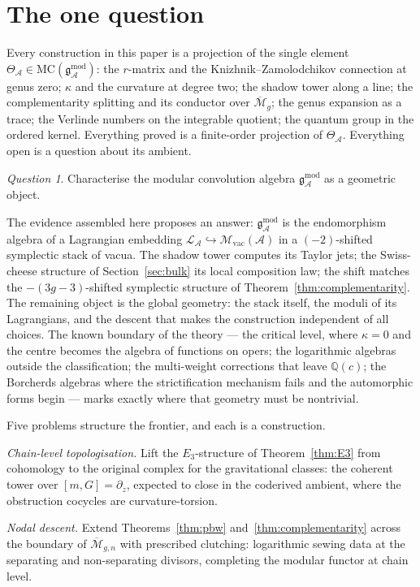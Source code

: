 \documentclass[11pt]{amsart}
\numberwithin{equation}{section}
\theoremstyle{plain}
\theoremstyle{definition}
\theoremstyle{remark}
\newtheorem{question}[theorem]{Question}
\newcommand{\cA}{\mathcal{A}}
\newcommand{\cM}{\mathcal{M}}
\newcommand{\cL}{\mathcal{L}}
\newcommand{\bQ}{\mathbb{Q}}
\newcommand{\gmod}{\mathfrak{g}^{\mathrm{mod}}}
\newcommand{\MC}{\mathrm{MC}}
\newcommand{\Mbar}{\overline{\cM}}
\begin{document}
\section{The one question}\label{sec:question}

Every construction in this paper is a projection of the single element
$\Theta_{\cA}\in\MC(\gmod_{\cA})$: the $r$-matrix and the
Knizhnik--Zamolodchikov connection at genus zero; $\kappa$ and the
curvature at degree two; the shadow tower along a line; the
complementarity splitting and its conductor over $\Mbar_g$; the genus
expansion as a trace; the Verlinde numbers on the integrable quotient;
the quantum group in the ordered kernel. Everything proved is a
finite-order projection of $\Theta_{\cA}$. Everything open is a
question about its ambient.

\begin{question}
Characterise the modular convolution algebra $\gmod_{\cA}$ as a
geometric object.
\end{question}

The evidence assembled here proposes an answer: $\gmod_{\cA}$ is the
endomorphism algebra of a Lagrangian embedding
$\cL_{\cA}\hookrightarrow\cM_{\mathrm{vac}}(\cA)$ in a
$(-2)$-shifted symplectic stack of vacua. The shadow tower computes
its Taylor jets; the Swiss-cheese structure of
Section~\ref{sec:bulk} its local composition law; the shift matches
the $-(3g-3)$-shifted symplectic structure of
Theorem~\ref{thm:complementarity}. The remaining object is the global
geometry: the stack itself, the moduli of its Lagrangians, and the
descent that makes the construction independent of all choices.
The known boundary of the theory --- the critical level, where
$\kappa=0$ and the centre becomes the algebra of functions on opers;
the logarithmic algebras outside the classification; the
multi-weight corrections that leave $\bQ(c)$; the Borcherds algebras
where the strictification mechanism fails and the automorphic forms
begin --- marks exactly where that geometry must be nontrivial.

Five problems structure the frontier, and each is a construction.

\emph{Chain-level topologisation.} Lift the $E_3$-structure of
Theorem~\ref{thm:E3} from cohomology to the original complex for the
gravitational classes: the coherent tower over $[m,G]=\partial_z$,
expected to close in the coderived ambient, where the obstruction
cocycles are curvature-torsion.

\emph{Nodal descent.} Extend Theorems~\ref{thm:pbw}
and~\ref{thm:complementarity} across the boundary of $\Mbar_{g,n}$
with prescribed clutching: logarithmic sewing data at the separating
and non-separating divisors, completing the modular functor at chain
level.
\end{document}
